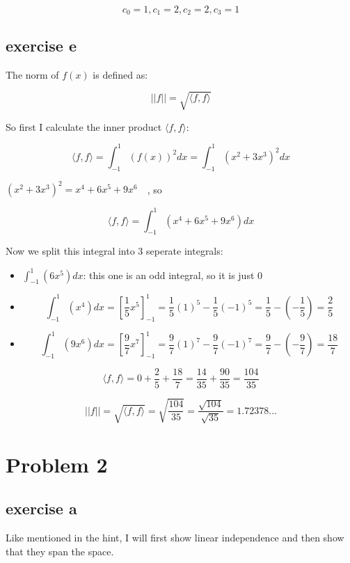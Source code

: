 \documentclass[11pt, a4paper]{article}
\begin{document}
\[
\boxed{
	c_0 = 1, c_1 = 2, c_2 = 2, c_3 = 1
}
\]


\subsection*{exercise e}

The norm of $f(x)$ is defined as:

\[
||f|| = \sqrt{\langle f, f \rangle}
\]

So first I calculate the inner product $\langle f, f \rangle$:

\[
\langle f, f \rangle = \int_{-1}^{1} {(f(x))}^2 dx = \int_{-1}^{1} {(x^2 + 3x^3)}^2 dx
\]

${(x^2 + 3x^3)}^2 = x^4 + 6x^5 + 9x^6 \quad$, so 

\[
\langle f, f \rangle = \int_{-1}^{1} (x^4 + 6x^5 + 9x^6) dx
\]

Now we split this integral into 3 seperate integrals:

\begin{itemize}
	\item $\int_{-1}^{1} (6x^5) dx$: this one is an odd integral, so it is just 0
	\item 	\[
				\int_{-1}^{1} (x^4) dx = {\left[ \frac{1}{5} x^5 \right]}_{-1}^{1} = \frac{1}{5} {(1)}^5 - \frac{1}{5} {(-1)}^5 = \frac{1}{5} - \left(-\frac{1}{5}\right) = \frac{2}{5}
			\] 
	\item 	\[
				\int_{-1}^{1} (9x^6) dx = {\left[ \frac{9}{7} x^7 \right]}_{-1}^{1} = \frac{9}{7} {(1)}^7 - \frac{9}{7} {(-1)}^7 = \frac{9}{7} - \left(-\frac{9}{7}\right) = \frac{18}{7}
			\]
\end{itemize}

\[
\langle f, f \rangle = 0 + \frac{2}{5} + \frac{18}{7} = \frac{14}{35} + \frac{90}{35} = \frac{104}{35}
\]

\[
||f|| = \sqrt{\langle f, f \rangle} = \sqrt{\frac{104}{35}} = \boxed{\frac{\sqrt{104}}{\sqrt{35}} = 1.72378 \ldots}
\]


\pagebreak
\section*{Problem 2}

\subsection*{exercise a}

Like mentioned in the hint, I will first show linear independence and then show that they span the space.
\end{document}
